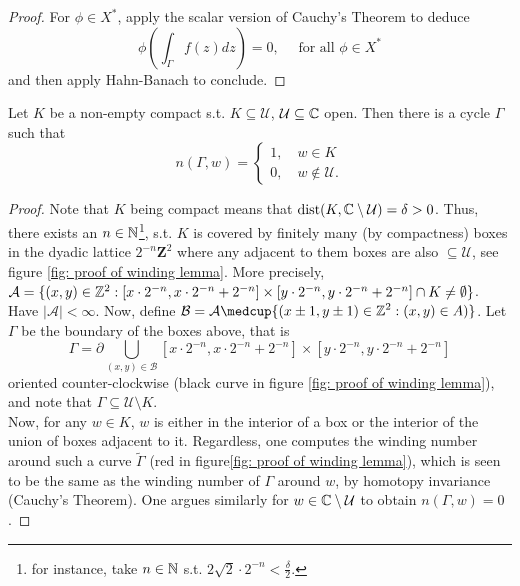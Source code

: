 \documentclass{article}
\begin{document}
\begin{proof}
    For $\phi\in X^*$, apply the scalar version of Cauchy's Theorem to deduce 
    $$
    \phi\left(\int_\Gamma f(z) dz\right) = 0, \quad \text{ for all }\phi\in X^* 
    $$
    and then apply Hahn-Banach to conclude. 
\end{proof}

\begin{boxlemma}\label{lemma: cycle winding lemma}
    Let $K$ be a non-empty compact s.t. $K\subseteq\mathcal{U}$, $\mathcal{U}\subseteq\mathbb{C}$ open. Then there is a cycle $\Gamma$ such that 
    $$n(\Gamma,w) = \begin{cases}
        1, \quad w\in K\\
        0, \quad w\not\in \mathcal{U}.
    \end{cases}$$
\end{boxlemma}

\begin{proof}
    Note that $K$ being compact means that $\operatorname{dist}(K, \mathbb{C}\setminus\mathcal{U})=\delta>0$. Thus, there exists an $n\in \mathbb{N}$\footnote{for instance, take $n\in \mathbb{N}$ s.t. $2\sqrt{2}\cdot 2^{-n}<\frac{\delta}{2}$.}, s.t. $K$ is covered by finitely many (by compactness) boxes in the dyadic lattice $2^{-n}\mathbf{Z}^2$ where any adjacent to them boxes are also $\subseteq \mathcal{U}$, see figure \ref{fig: proof of winding lemma}. More precisely, $\mathcal{A} = \{(x,y)\in \mathbb{Z}^2: [x\cdot2^{-n},x\cdot 2^{-n}+2^{-n}]\times[y\cdot2^{-n},y\cdot 2^{-n}+2^{-n}]\cap K \neq \emptyset\}$. Have $|\mathcal{A}|<\infty$. Now, define $\mathcal{B} = \mathcal{A}\displaystyle\medcup\{(x\pm1,y\pm1)\in \Z^2: (x,y)\in A)\}$. Let $\Gamma$ be the boundary of the boxes above, that is 
    $$
    \Gamma = \partial \displaystyle\bigcup_{(x,y)\in \mathcal{B}}[x\cdot2^{-n},x\cdot 2^{-n}+2^{-n}]\times[y\cdot2^{-n},y\cdot 2^{-n}+2^{-n}]
    $$
    oriented counter-clockwise (black curve in figure \ref{fig: proof of winding lemma}), and note that $\Gamma\subseteq \mathcal{U}\setminus K$.\\
    
    Now, for any $w\in K$, $w$ is either in the interior of a box or the interior of the union of boxes adjacent to it. Regardless, one computes the winding number around such a curve $\tilde{\Gamma}$ (red in figure\ref{fig: proof of winding lemma}), which is seen to be the same as the winding number of $\Gamma$ around $w$, by homotopy invariance (Cauchy's Theorem). One argues similarly for $w\in \mathbb{C}\setminus\mathcal{U}$ to obtain $n(\Gamma, w)=0$. 
\end{proof}
\end{document}
